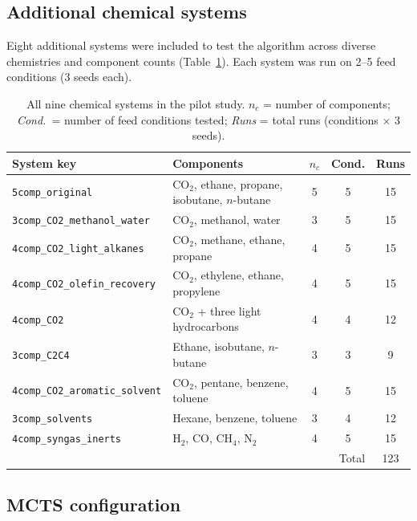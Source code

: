 \documentclass[11pt,a4paper]{article}
\theoremstyle{definition}
\theoremstyle{plain}
\begin{document}
\subsection{Additional chemical systems}
\label{sec:all_systems}

Eight additional systems were included to test the algorithm across diverse chemistries and component counts (Table~\ref{tab:all_systems}). Each system was run on 2--5 feed conditions (3 seeds each).

\begin{table}[ht]
\centering
\caption{All nine chemical systems in the pilot study.
 $n_c$ = number of components; \emph{Cond.}\ = number of
 feed conditions tested; \emph{Runs} = total runs
 (conditions $\times$ 3 seeds).}
\label{tab:all_systems}
\small
\begin{tabular}{@{}lp{5cm}ccc@{}}
\toprule
System key & Components & $n_c$ & Cond. & Runs \\
\midrule
\texttt{5comp\_original}
 & CO$_2$, ethane, propane, isobutane, $n$-butane & 5 & 5 & 15 \\
\texttt{3comp\_CO2\_methanol\_water}
 & CO$_2$, methanol, water & 3 & 5 & 15 \\
\texttt{4comp\_CO2\_light\_alkanes}
 & CO$_2$, methane, ethane, propane & 4 & 5 & 15 \\
\texttt{4comp\_CO2\_olefin\_recovery}
 & CO$_2$, ethylene, ethane, propylene & 4 & 5 & 15 \\
\texttt{4comp\_CO2}
 & CO$_2$ + three light hydrocarbons & 4 & 4 & 12 \\
\texttt{3comp\_C2C4}
 & Ethane, isobutane, $n$-butane & 3 & 3 & 9 \\
\texttt{4comp\_CO2\_aromatic\_solvent}
 & CO$_2$, pentane, benzene, toluene & 4 & 5 & 15 \\
\texttt{3comp\_solvents}
 & Hexane, benzene, toluene & 3 & 4 & 12 \\
\texttt{4comp\_syngas\_inerts}
 & H$_2$, CO, CH$_4$, N$_2$ & 4 & 5 & 15 \\
\midrule
\multicolumn{4}{r}{Total} & 123 \\
\bottomrule
\end{tabular}
\normalsize
\end{table}

\subsection{MCTS configuration}
\end{document}
